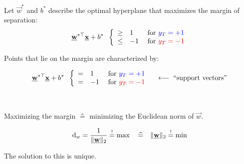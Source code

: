 \begin{frame}\frametitle{\subsecname}
\begin{minipage}{6cm}
Let $\vec w^{*}$ and $b^{*}$ describe the optimal hyperplane that maximizes the margin of separation:
    \begin{equation}
    \vec w^{*\top} \vec x + b^{*} \;\;
    \left \{ \begin{array}{lll}
					\ge& 1 \;&\text{for } {\color{blue}y_{T} = +1}\\
					\le& -1 \;&\text{for } {\color{red}y_{T} = -1}
				\end{array} \right.  
    \end{equation}
    
    Points that lie on the margin are characterized by:
    
    \slidesonly{\vspace{-3mm}}
    
    \begin{equation}
    \vec w^{*\top} \vec x + b^{*} \;\;
    \left \{ \begin{array}{lll}
					=& 1 \;&\text{for } {\color{blue}y_{T} = +1}\\
					=& -1 \;&\text{for } {\color{red}y_{T} = -1}
				\end{array} \right.
			\quad \longleftarrow\; \text{``support vectors''} 
    \end{equation}
    
       

\end{minipage}\\
  
    
    \slidesonly{\vspace{3mm}}
    
    Maximizing the margin $\corresponds$ minimizing the Euclidean norm of $\vec w$.
    
    
    \begin{equation}
    \mathrm{d}_{w} = \frac{1}{\lVert \vec w \rVert_2} \eqexcl \max 
    \quad \corresponds \quad 
    \lVert \vec w \rVert_2 \eqexcl \min
    \end{equation}
    
    
    The solution to this is unique.

\end{frame}

